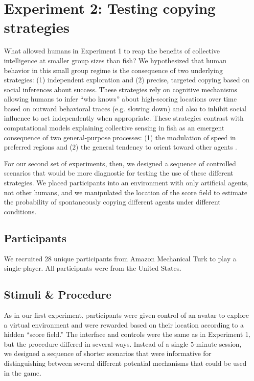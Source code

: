 \documentclass[12pt,letterpaper]{article}
\begin{document}
\section{Experiment 2: Testing copying strategies}

What allowed humans in Experiment 1 to reap the benefits of collective intelligence at smaller group sizes than fish?
We hypothesized that human behavior in this small group regime is the consequence of two underlying strategies: (1) independent exploration and (2) precise, targeted copying based on social inferences about success. 
These strategies rely on cognitive mechanisms allowing humans to infer ``who knows'' about high-scoring locations over time based on outward behavioral traces (e.g. slowing down) and also to inhibit social influence to act independently when appropriate.
These strategies contrast with computational models explaining collective sensing in fish as an emergent consequence of two general-purpose processes: (1) the modulation of speed in preferred regions and (2) the general tendency to orient toward other agents \cite{berdahl_emergent_2013}.

For our second set of experiments, then, we designed a sequence of controlled scenarios that would be more diagnostic for testing the use of these different strategies.
We placed participants into an environment with only artificial agents, not other humans, and we manipulated the location of the score field to estimate the probability of spontaneously copying different agents under different conditions.

\subsection{Participants}

We recruited 28 unique participants from Amazon Mechanical Turk to play a single-player.
All participants were from the United
States.

\subsection{Stimuli \& Procedure}

As in our first experiment, participants were given control of an avatar to explore a virtual environment and were rewarded based on their location according to a hidden ``score field.'' 
The interface and controls were the same as in Experiment 1, but the procedure differed in several ways. 
Instead of a single 5-minute session, we designed a sequence of shorter scenarios that were informative for distinguishing between several different potential mechanisms that could be used in the game.
\end{document}
